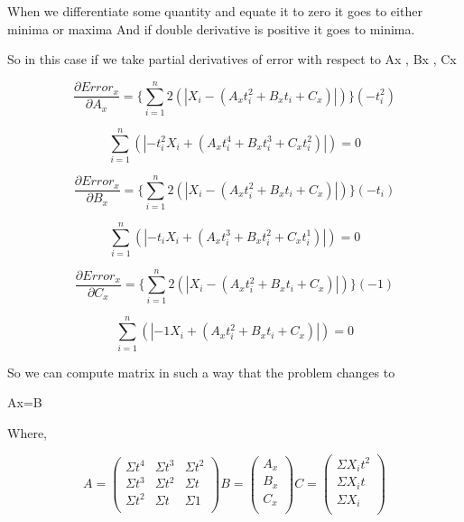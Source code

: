 When we differentiate some quantity and equate it to zero it goes to either minima or maxima
And if double derivative is positive it goes to minima.

So in this case if we take partial derivatives of error with respect to Ax , Bx , Cx

\begin{equation} 
 \frac{\partial Error_x}{\partial A_x} = {\lbrace\displaystyle\sum_{i=1}^{n}2(|X_i-(A_xt_i^2+B_x t_i +C_x)|)\rbrace}({-t_i^2})
\end{equation}

\begin{equation} 
\displaystyle\sum_{i=1}^{n}(|{-t_i^2}X_i+(A_x t_i^4+B_x t_i^3+C_x t_i^2)|) = 0
\end{equation}

\begin{equation} 
 \frac{\partial Error_x}{\partial B_x} = {\lbrace\displaystyle\sum_{i=1}^{n}2(|X_i-(A_xt_i^2+B_x t_i +C_x)|)\rbrace}({-t_i})
\end{equation}

\begin{equation} 
\displaystyle\sum_{i=1}^{n}(|{-t_i}X_i+(A_x t_i^3+B_x t_i^2+C_x t_i^1)|) = 0
\end{equation}

\begin{equation} 
 \frac{\partial Error_x}{\partial C_x} = {\lbrace\displaystyle\sum_{i=1}^{n}2(|X_i-(A_xt_i^2+B_x t_i +C_x)|)\rbrace}({-1})
\end{equation}

\begin{equation} 
\displaystyle\sum_{i=1}^{n}(|{-1}X_i+(A_x t_i^2+B_x t_i+C_x)|) = 0
\end{equation}

So we can compute matrix in such a way that the problem changes to 

Ax=B

Where, 

\begin{equation}
A = 
\begin{pmatrix}
  \Sigma t^4 & \Sigma t^3 & \Sigma t^2\\
  \Sigma t^3 & \Sigma t^2 & \Sigma t\\
  \Sigma t^2 & \Sigma t & \Sigma 1\\
 \end{pmatrix}
B = 
\begin{pmatrix}
  A_x \\
  B_x \\
  C_x \\
 \end{pmatrix}
 C = 
\begin{pmatrix}
  \Sigma X_i t ^2 \\
  \Sigma X_i t \\
  \Sigma X_i \\
 \end{pmatrix}
\end{equation}

